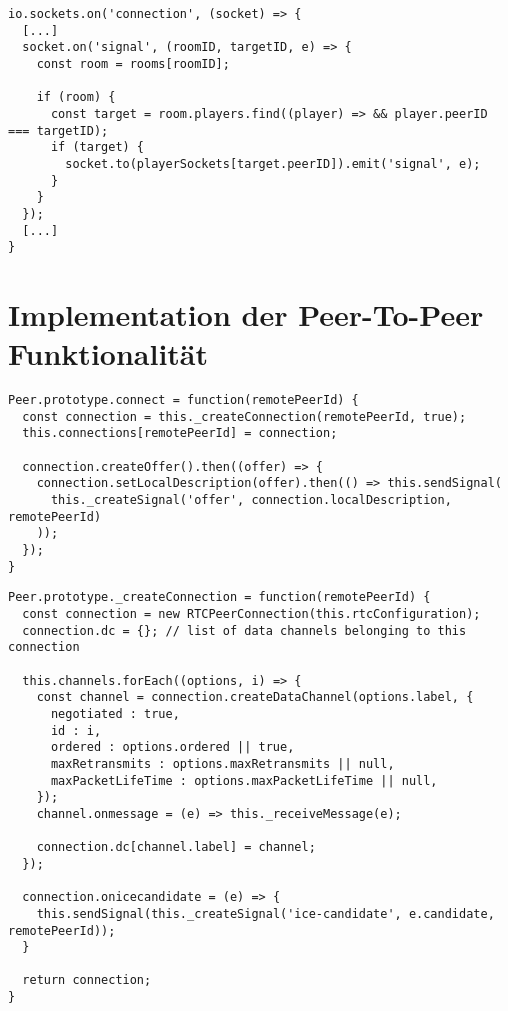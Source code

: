\vspace{11pt}
\lstset{language=js, style=STYLE_CODE_JS}
\begin{singlespace}
\begin{lstlisting}[caption={Event zum Weiterleiten eines Signals -- Server.js}, captionpos=b, label={lst:signalserver}]
io.sockets.on('connection', (socket) => {
  [...]
  socket.on('signal', (roomID, targetID, e) => {
    const room = rooms[roomID];

    if (room) {
      const target = room.players.find((player) => && player.peerID === targetID);
      if (target) {
        socket.to(playerSockets[target.peerID]).emit('signal', e);
      }
    }
  });
  [...]
}
\end{lstlisting}
\end{singlespace}

\section{Implementation der Peer-To-Peer Funktionalität}



\lstset{language=js, style=STYLE_CODE_JS}
\begin{lstlisting}[caption={Javascript LstListing Test}, captionpos=b, label={lst:candidate}]
Peer.prototype.connect = function(remotePeerId) {
  const connection = this._createConnection(remotePeerId, true);
  this.connections[remotePeerId] = connection;

  connection.createOffer().then((offer) => {
    connection.setLocalDescription(offer).then(() => this.sendSignal(
      this._createSignal('offer', connection.localDescription, remotePeerId)
    ));
  });
}
\end{lstlisting}

\begin{lstlisting}[caption={Javascript LstListing Test}, captionpos=b, label={lst:candidate}]
Peer.prototype._createConnection = function(remotePeerId) {
  const connection = new RTCPeerConnection(this.rtcConfiguration);
  connection.dc = {}; // list of data channels belonging to this connection

  this.channels.forEach((options, i) => {
    const channel = connection.createDataChannel(options.label, {
      negotiated : true,
      id : i,
      ordered : options.ordered || true,
      maxRetransmits : options.maxRetransmits || null,
      maxPacketLifeTime : options.maxPacketLifeTime || null,
    });
    channel.onmessage = (e) => this._receiveMessage(e);

    connection.dc[channel.label] = channel;
  });

  connection.onicecandidate = (e) => {
    this.sendSignal(this._createSignal('ice-candidate', e.candidate, remotePeerId));
  }

  return connection;
}
\end{lstlisting}

